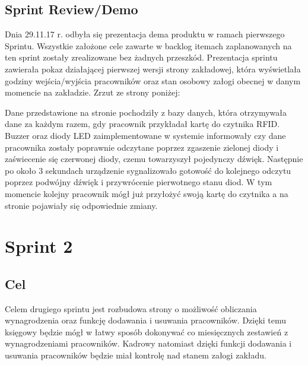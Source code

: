 \documentclass[a4paper]{article}
\begin{document}
\subsection{Sprint Review/Demo}

Dnia 29.11.17 r. odbyła się prezentacja dema produktu w ramach pierwszego Sprintu. Wszystkie założone cele zawarte w backlog itemach zaplanowanych na ten sprint zostały zrealizowane bez żadnych przeszkód. Prezentacja sprintu zawierała pokaz działającej pierwszej wersji strony zakładowej, która wyświetlała godziny wejścia/wyjścia pracowników oraz stan osobowy załogi obecnej w danym momencie na zakładzie.    
Zrzut ze strony poniżej:
\begin{figure}[!htbp]
\end{figure}

Dane przedstawione na stronie pochodziły z bazy danych, która otrzymywała dane za każdym razem, gdy pracownik przykładał kartę do czytnika RFID. Buzzer oraz diody LED  zaimplementowane w systemie informowały czy dane pracownika zostały poprawnie odczytane  poprzez zgaszenie  zielonej diody i zaświecenie się czerwonej diody, czemu towarzyszył pojedynczy dźwięk. Następnie po około 3 sekundach urządzenie sygnalizowało gotowość do kolejnego odczytu poprzez podwójny dźwięk i przywrócenie pierwotnego stanu diod. W tym momencie kolejny pracownik mógł już przyłożyć swoją kartę do czytnika a na stronie pojawiały się odpowiednie zmiany.

\section{Sprint 2}

\subsection{Cel} Celem drugiego sprintu jest rozbudowa strony o możliwość obliczania wynagrodzenia oraz funkcję dodawania i usuwania pracowników. Dzięki temu księgowy będzie mógł w łatwy sposób dokonywać co miesięcznych zestawień z wynagrodzeniami pracowników. Kadrowy natomiast dzięki funkcji dodawania i usuwania pracowników będzie miał kontrolę nad stanem załogi zakładu.
\end{document}
